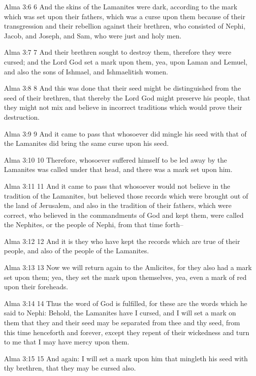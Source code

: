 Alma 3:6
 6 And the skins of the Lamanites were dark, according to the
mark which was set upon their fathers, which was a curse upon
them because of their transgression and their rebellion against
their brethren, who consisted of Nephi, Jacob, and Joseph, and
Sam, who were just and holy men.

Alma 3:7
 7 And their brethren sought to destroy them, therefore they were
cursed; and the Lord God set a mark upon them, yea, upon Laman
and Lemuel, and also the sons of Ishmael, and Ishmaelitish women.

Alma 3:8
 8 And this was done that their seed might be distinguished from
the seed of their brethren, that thereby the Lord God might
preserve his people, that they might not mix and believe in
incorrect traditions which would prove their destruction.

Alma 3:9
 9 And it came to pass that whosoever did mingle his seed with
that of the Lamanites did bring the same curse upon his seed.

Alma 3:10
 10 Therefore, whosoever suffered himself to be led away by the
Lamanites was called under that head, and there was a mark set
upon him.

Alma 3:11
 11 And it came to pass that whosoever would not believe in the
tradition of the Lamanites, but believed those records which were
brought out of the land of Jerusalem, and also in the tradition
of their fathers, which were correct, who believed in the
commandments of God and kept them, were called the Nephites, or
the people of Nephi, from that time forth--

Alma 3:12
 12 And it is they who have kept the records which are true of
their people, and also of the people of the Lamanites.

Alma 3:13
 13 Now we will return again to the Amlicites, for they also had
a mark set upon them; yea, they set the mark upon themselves,
yea, even a mark of red upon their foreheads.

Alma 3:14
 14 Thus the word of God is fulfilled, for these are the words
which he said to Nephi: Behold, the Lamanites have I cursed, and
I will set a mark on them that they and their seed may be
separated from thee and thy seed, from this time henceforth and
forever, except they repent of their wickedness and turn to me
that I may have mercy upon them.

Alma 3:15
 15 And again: I will set a mark upon him that mingleth his seed
with thy brethren, that they may be cursed also.

